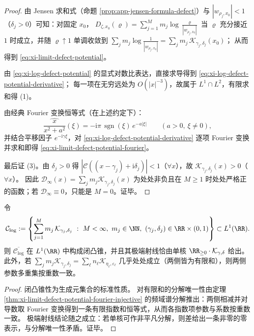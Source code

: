 \begin{proof}
由 Jensen 求和式（命题 \ref{prop:app-jensen-formula-defect}）与 \(|w_{\rho_j,x_0}|<1\)（\(\delta_j>0\)）可知：对固定 \(x_0\)，
\(
D_{\zeta,x_0}(\varrho)
=\sum_{j=1}^{M}m_j\log\frac{\varrho}{|w_{\rho_j,x_0}|}
\)
当 \(\varrho\) 充分接近 \(1\) 时成立，并随 \(\varrho\uparrow 1\) 单调收敛到
\(
\sum_j m_j\log\frac{1}{|w_{\rho_j,x_0}|}
=\sum_j m_j\,\mathcal{K}_{\gamma_j,\delta_j}(x_0)
\)；
从而得到 \eqref{eq:xi-limit-defect-potential}。
\par
由 \eqref{eq:xi-log-defect-potential} 的显式对数比表达，直接求导得到 \eqref{eq:xi-log-defect-potential-derivative}；
每一项在无穷远处为 \(O(|x|^{-3})\)，故属于 \(L^1\cap L^2\)，有限求和得 (1)。
\par
由经典 Fourier 变换恒等式（在上述约定下）：
\[
\widehat{\frac{x}{x^2+a^2}}(\xi)
=-\mathrm{i}\pi\,\operatorname{sgn}(\xi)\,e^{-a|\xi|}\qquad(a>0,\ \xi\neq 0),
\]
并结合平移因子 \(e^{-\mathrm{i}\gamma\xi}\)，对 \eqref{eq:xi-log-defect-potential-derivative} 逐项 Fourier 变换并求和即得 \eqref{eq:xi-limit-defect-potential-fourier}。
\par
最后证 (3)。由 \(\delta_j>0\) 得 \(|\mathcal{C}((x-\gamma_j)+\mathrm{i}\delta_j)|<1\)（\(\forall x\)），故 \(\mathcal{K}_{\gamma_j,\delta_j}(x)>0\)（\(\forall x\)）。
因此 \(\mathcal{D}_\infty(x)=\sum_j m_j\mathcal{K}_{\gamma_j,\delta_j}(x)\) 为处处非负且在 \(M\ge 1\) 时处处严格正的函数；若 \(\mathcal{D}_\infty\equiv 0\)，只能是 \(M=0\)。证毕。
\end{proof}



\begin{corollary}\label{cor:xi-log-defect-cone-extreme}
令
\[
\mathcal{C}_{\log}:=\left\{\sum_{j=1}^{M} m_j\,\mathcal{K}_{\gamma_j,\delta_j}\ :\ M<\infty,\ m_j\in\NN,\ (\gamma_j,\delta_j)\in\RR\times(0,1)\right\}\subset L^1(\RR).
\]
则 \(\overline{\mathcal{C}_{\log}}\) 在 \(L^1(\RR)\) 中构成闭凸锥，并且其极端射线恰由单核 \(\RR_{\ge 0}\cdot\mathcal{K}_{\gamma,\delta}\) 给出。
此外，若
\(
\sum_j m_j\mathcal{K}_{\gamma_j,\delta_j}=\sum_\ell n_\ell\mathcal{K}_{\eta_\ell,\varepsilon_\ell}
\)
几乎处处成立（两侧皆为有限和），则两侧参数多重集按重数一致。
\end{corollary}

\begin{proof}
闭凸锥性为生成元集合的标准性质。
对有限和的分解唯一性由定理 \ref{thm:xi-limit-defect-potential-fourier-injective} 的频域谱分解推出：两侧相减并对导数取 Fourier 变换得到一条有限指数和恒等式，从而各指数项参数与系数按重数一致。
极端射线结论随之成立：若单核可作非平凡分解，则差给出一条非零的零表示，与分解唯一性矛盾。证毕。
\end{proof}

